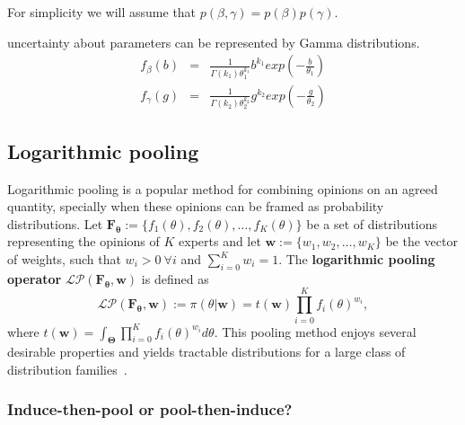 \documentclass[11pt]{article}
\begin{document}
For simplicity we will assume that $p(\beta, \gamma) = p(\beta)p(\gamma)$.

uncertainty about parameters can be represented by Gamma distributions.
\begin{eqnarray*}
f_{\beta}(b) &=& \frac{1}{\Gamma(k_1)\theta_1^{k_1}} b^{k_1} exp (- \frac{b}{\theta_1} ) \\
f_{\gamma}(g) &=& \frac{1}{\Gamma(k_2)\theta_2^{k_2}} g^{k_2} exp (- \frac{g}{\theta_2})
\end{eqnarray*}

\subsection{Logarithmic pooling} 

Logarithmic pooling is a popular method for combining opinions on an agreed quantity, specially when these opinions can be framed as probability distributions.
Let $\mathbf{F_\theta} := \{f_1(\theta), f_2(\theta), \ldots, f_K(\theta)\}$ be a set of distributions representing the opinions of $K$ experts and let $\mathbf{w} :=\{w_1, w_2, \ldots, w_K \}$ be the vector of weights, such that $w_i > 0\: \forall i$ and $\sum_{i=0}^K w_i = 1$.
The \textbf{logarithmic pooling operator} $\mathcal{LP}(\mathbf{F_\theta}, \mathbf{w})$ is defined as
\begin{equation}
\label{eq:logpool}
 \mathcal{LP}(\mathbf{F_\theta}, \mathbf{w}) :=  \pi(\theta | \mathbf{w}) = t(\mathbf{w}) \prod_{i=0}^K f_i(\theta)^{w_i},
\end{equation}
where $t(\mathbf{w}) = \int_{\boldsymbol\Theta}\prod_{i=0}^K f_i(\theta)^{w_i}d\theta$.
This pooling method enjoys several desirable properties and yields tractable distributions for a large class of distribution families~\citep{genest1984, carvalho2016}.

\subsubsection{Induce-then-pool or pool-then-induce?}
\end{document}
